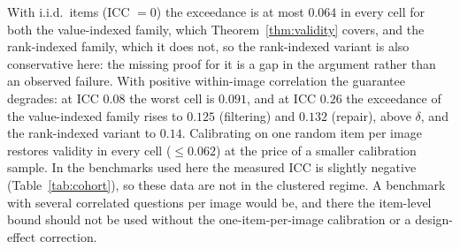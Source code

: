 With i.i.d.\ items (ICC $=0$) the exceedance is at most $0.064$ in every cell for both the value-indexed family, which
Theorem~\ref{thm:validity} covers, and the rank-indexed family, which it does not, so the rank-indexed variant is also
conservative here: the missing proof for it is a gap in the argument rather than an observed failure. With positive
within-image correlation the guarantee degrades: at ICC $0.08$ the worst cell is $0.091$, and at ICC $0.26$ the
exceedance of the value-indexed family rises to $0.125$ (filtering) and $0.132$ (repair), above $\delta$, and the rank-indexed
variant to $0.14$. Calibrating on one random item per image restores validity in every cell ($\le0.062$) at the price of a
smaller calibration sample. In the benchmarks used here the measured ICC is slightly negative
(Table~\ref{tab:cohort}), so these data are not in the clustered regime. A benchmark with several correlated questions per image would be, and there the item-level bound
should not be used without the one-item-per-image calibration or a design-effect correction.
